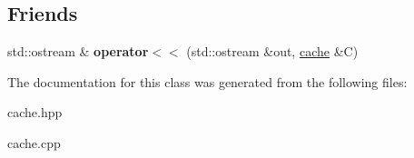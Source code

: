 \subsection*{\-Friends}
\begin{DoxyCompactItemize}
\item 
\hypertarget{classcache_ab7cf2c423371f01c39025b0c4ee290e3}{std\-::ostream \& {\bfseries operator$<$$<$} (std\-::ostream \&out, \hyperlink{classcache}{cache} \&\-C)}\label{classcache_ab7cf2c423371f01c39025b0c4ee290e3}

\end{DoxyCompactItemize}


\-The documentation for this class was generated from the following files\-:\begin{DoxyCompactItemize}
\item 
cache.\-hpp\item 
cache.\-cpp\end{DoxyCompactItemize}
